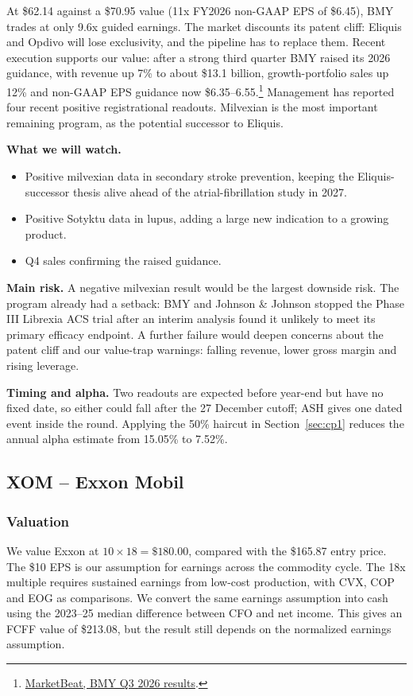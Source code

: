 \documentclass[10pt,a4paper]{article}
\begin{document}
At \$62.14 against a \$70.95 value (11x FY2026 non-GAAP EPS of \$6.45), BMY trades at only 9.6x guided earnings. The market discounts its patent cliff: Eliquis and Opdivo will lose exclusivity, and the pipeline has to replace them. Recent execution supports our value: after a strong third quarter BMY raised its 2026 guidance, with revenue up 7\% to about \$13.1 billion, growth-portfolio sales up 12\% and non-GAAP EPS guidance now \$6.35--6.55.\footnote{\href{https://www.marketbeat.com/earnings/reports/2026-10-29-bristol-myers-squibb-stock/}{MarketBeat, BMY Q3 2026 results}.} Management has reported four recent positive registrational readouts. Milvexian is the most important remaining program, as the potential successor to Eliquis.

\textbf{What we will watch.}
\begin{itemize}[leftmargin=1.2em,itemsep=2pt,topsep=2pt]
  \item Positive milvexian data in secondary stroke prevention, keeping the Eliquis-successor thesis alive ahead of the atrial-fibrillation study in 2027.
  \item Positive Sotyktu data in lupus, adding a large new indication to a growing product.
  \item Q4 sales confirming the raised guidance.
\end{itemize}

\textbf{Main risk.} A negative milvexian result would be the largest downside risk. The program already had a setback: BMY and Johnson \& Johnson stopped the Phase III Librexia ACS trial after an interim analysis found it unlikely to meet its primary efficacy endpoint. A further failure would deepen concerns about the patent cliff and our value-trap warnings: falling revenue, lower gross margin and rising leverage.

\textbf{Timing and alpha.} Two readouts are expected before year-end but have no fixed date, so either could fall after the 27 December cutoff; ASH gives one dated event inside the round. Applying the 50\% haircut in Section~\ref{sec:cp1} reduces the annual alpha estimate from 15.05\% to 7.52\%.

\subsection{XOM -- Exxon Mobil}

\subsubsection*{Valuation}
We value Exxon at $10\times18=\$180.00$, compared with the \$165.87 entry price. The \$10 EPS is our assumption for earnings across the commodity cycle. The 18x multiple requires sustained earnings from low-cost production, with CVX, COP and EOG as comparisons. We convert the same earnings assumption into cash using the 2023--25 median difference between CFO and net income. This gives an FCFF value of \$213.08, but the result still depends on the normalized earnings assumption.
\end{document}
